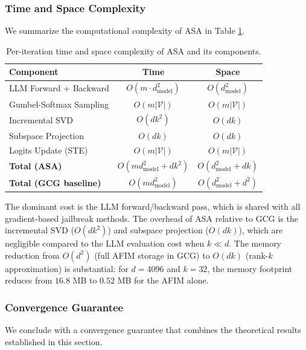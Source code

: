\documentclass[preprint,12pt]{elsarticle}
\begin{document}
\subsubsection{Time and Space Complexity}
\label{sec:alg_complexity}

We summarize the computational complexity of ASA in Table \ref{tab:complexity}.

\begin{table}[t]
\centering
\caption{Per-iteration time and space complexity of ASA and its components.}
\label{tab:complexity}
\begin{tabular}{lcc}
\toprule
\textbf{Component} & \textbf{Time} & \textbf{Space} \\
\midrule
LLM Forward + Backward & $O(m \cdot d_{\text{model}}^2)$ & $O(d_{\text{model}}^2)$ \\
Gumbel-Softmax Sampling & $O(m |\mathcal{V}|)$ & $O(m |\mathcal{V}|)$ \\
Incremental SVD & $O(d k^2)$ & $O(d k)$ \\
Subspace Projection & $O(d k)$ & $O(d k)$ \\
Logits Update (STE) & $O(m |\mathcal{V}|)$ & $O(m |\mathcal{V}|)$ \\
\midrule
\textbf{Total (ASA)} & $O(m d_{\text{model}}^2 + d k^2)$ & $O(d_{\text{model}}^2 + d k)$ \\
\textbf{Total (GCG baseline)} & $O(m d_{\text{model}}^2)$ & $O(d_{\text{model}}^2 + d^2)$ \\
\bottomrule
\end{tabular}
\end{table}

The dominant cost is the LLM forward/backward pass, which is shared with all gradient-based jailbreak methods. The overhead of ASA relative to GCG is the incremental SVD ($O(dk^2)$) and subspace projection ($O(dk)$), which are negligible compared to the LLM evaluation cost when $k \ll d$. The memory reduction from $O(d^2)$ (full AFIM storage in GCG) to $O(dk)$ (rank-$k$ approximation) is substantial: for $d = 4096$ and $k = 32$, the memory footprint reduces from $16.8$ MB to $0.52$ MB for the AFIM alone.

\subsubsection{Convergence Guarantee}
\label{sec:alg_convergence}

We conclude with a convergence guarantee that combines the theoretical results established in this section.
\end{document}
